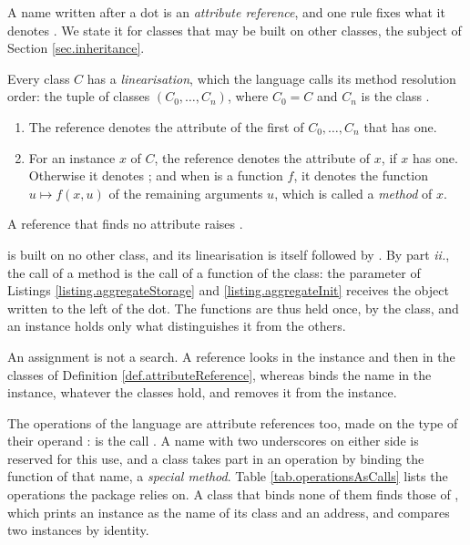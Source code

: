 A name written after a dot is an \emph{attribute reference},
and one rule fixes what it denotes \citep[Section 9.3]{PSF26tut}.
We state it for classes that may be built on other classes,
the subject of Section \ref{sec.inheritance}.

\begin{defi}\label{def.attributeReference}
 Every class $C$ has a \emph{linearisation},
 which the language calls its method resolution order:
 the tuple  of classes $(C_0, \dots, C_n)$,
 where $C_0 = C$ and $C_n$ is the class .
 \begin{enumerate}[label={\emph{\roman{*}}.}]
  \item The reference  denotes the attribute 
        of the first of $C_0, \dots, C_n$ that has one.
  \item For an instance $x$ of $C$,
        the reference  denotes the attribute  of $x$,
        if $x$ has one.
        Otherwise it denotes ;
        and when  is a function $f$,
        it denotes the function $u \mapsto f(x, u)$ of the remaining arguments $u$,
        which is called a \emph{method} of $x$.
 \end{enumerate}
 A reference that finds no attribute raises .
\end{defi}

 is built on no other class,
and its linearisation is itself followed by .
By part \emph{ii.}, the call  of a method
is the call  of a function of the class:
the parameter  of Listings \ref{listing.aggregateStorage}
and \ref{listing.aggregateInit} receives the object written to the left of the dot.
The functions are thus held once, by the class,
and an instance holds only what distinguishes it from the others.

An assignment is not a search.
A reference looks in the instance and then in the classes of Definition \ref{def.attributeReference},
whereas  binds the name in the instance, whatever the classes hold,
and  removes it from the instance.

The operations of the language are attribute references too,
made on the type of their operand \citep[Section 3.3]{PSF26lan}:
 is the call .
A name with two underscores on either side is reserved for this use,
and a class takes part in an operation by binding the function of that name,
a \emph{special method}.
Table \ref{tab.operationsAsCalls} lists the operations the package relies on.
A class that binds none of them finds those of ,
which prints an instance as the name of its class and an address,
and compares two instances by identity.


